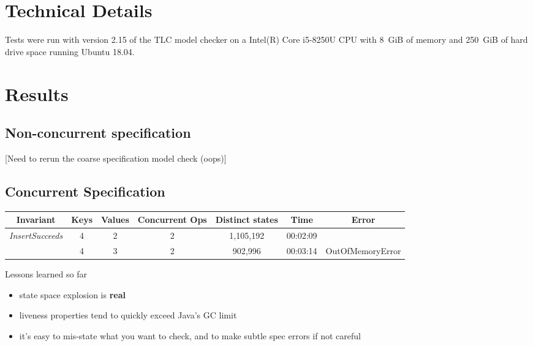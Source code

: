 \documentclass{uit-thesis}
\begin{document}
\section{Technical Details}
Tests were run with version 2.15 of the TLC model checker on a Intel(R) Core i5-8250U CPU with 8~GiB of memory and 250~GiB of hard drive space running Ubuntu 18.04.
\section{Results}
\subsection{Non-concurrent specification}
[Need to rerun the coarse specification model check (oops)]

\subsection{Concurrent Specification}

\begin{tabular}{ |c|c|c|c||c|c|c| }
    \hline
    Invariant & Keys & Values & Concurrent Ops & Distinct states & Time & Error \\
    \hline
    \textit{InsertSucceeds} & 4 & 2 & 2 & 1,105,192 & 00:02:09 &\\
                            & 4 & 3 & 2 & 902,996   & 00:03:14 & OutOfMemoryError\\

    \hline
\end{tabular}

Lessons learned so far
\begin{itemize}
    \item state space explosion is \textbf{real}
    \item liveness properties tend to quickly exceed Java's GC limit
    \item it's easy to mis-state what you want to check, and to make subtle spec errors if not careful
\end{itemize}
\end{document}
